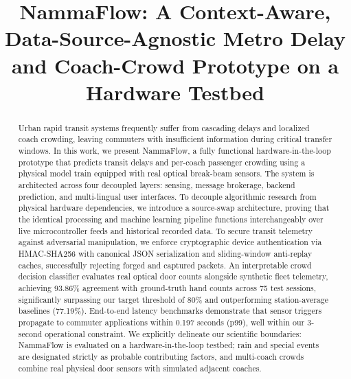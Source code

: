 \documentclass[conference]{IEEEtran}
\begin{document}
\title{NammaFlow: A Context-Aware, Data-Source-Agnostic Metro Delay and Coach-Crowd Prototype on a Hardware Testbed}

\author{
}

\maketitle

\begin{abstract}
Urban rapid transit systems frequently suffer from cascading delays and localized coach crowding, leaving commuters with insufficient information during critical transfer windows. In this work, we present NammaFlow, a fully functional hardware-in-the-loop prototype that predicts transit delays and per-coach passenger crowding using a physical model train equipped with real optical break-beam sensors. The system is architected across four decoupled layers: sensing, message brokerage, backend prediction, and multi-lingual user interfaces. To decouple algorithmic research from physical hardware dependencies, we introduce a source-swap architecture, proving that the identical processing and machine learning pipeline functions interchangeably over live microcontroller feeds and historical recorded data. To secure transit telemetry against adversarial manipulation, we enforce cryptographic device authentication via HMAC-SHA256 with canonical JSON serialization and sliding-window anti-replay caches, successfully rejecting forged and captured packets. An interpretable crowd decision classifier evaluates real optical door counts alongside synthetic fleet telemetry, achieving 93.86\% agreement with ground-truth hand counts across 75 test sessions, significantly surpassing our target threshold of 80\% and outperforming station-average baselines (77.19\%). End-to-end latency benchmarks demonstrate that sensor triggers propagate to commuter applications within 0.197 seconds (p99), well within our 3-second operational constraint. We explicitly delineate our scientific boundaries: NammaFlow is evaluated on a hardware-in-the-loop testbed; rain and special events are designated strictly as probable contributing factors, and multi-coach crowds combine real physical door sensors with simulated adjacent coaches.
\end{abstract}
\end{document}
